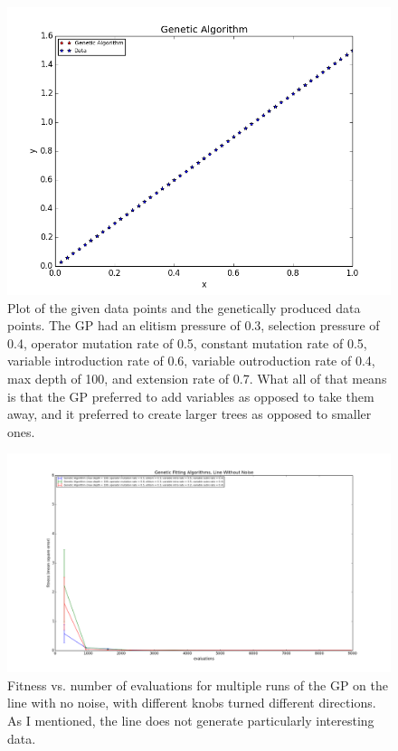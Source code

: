 \documentclass[11pt,amsmath,amssymb]{revtex4}
\begin{document}
\begin{figure}[H]
\center
\includegraphics[scale=0.55]{Line_No_Noise.png}
\caption{Plot of the given data points and the genetically produced data points. The GP had an elitism pressure of 0.3, selection pressure of 0.4, operator mutation rate of 0.5, constant mutation rate of 0.5, variable introduction rate of 0.6, variable outroduction rate of 0.4, max depth of 100, and extension rate of 0.7. What all of that means is that the GP preferred to add variables as opposed to take them away, and it preferred to create larger trees as opposed to smaller ones.}
\label{q1}
\end{figure}

\begin{figure}[H]
\center
\includegraphics[scale=0.4]{Line_No_Noise_Comparison.png}
\caption{Fitness vs. number of evaluations for multiple runs of the GP on the line with no noise, with different knobs turned different directions. As I mentioned, the line does not generate particularly interesting data.}
\label{q1}
\end{figure}
\end{document}
